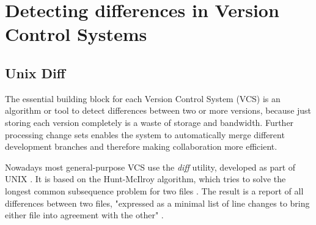 	
	

\section{Detecting differences in Version Control Systems}
	\label{sec:background:diff}
	
	\subsection{Unix Diff}
	\label{sec:background:diff:unix-diff}
	The essential building block for each Version Control System (VCS) is an algorithm or tool to detect differences between two or more versions, because just storing each version completely is a waste of storage and bandwidth. Further processing change sets enables the system to automatically merge different development branches and therefore making collaboration more efficient.
	
	Nowadays most general-purpose VCS use the \emph{diff} utility, developed as part of UNIX \citep{Chacon2014,OSullivan2009,Collins-Sussman2004}. It is based on the Hunt-McIlroy algorithm, which tries to solve the longest common subsequence problem for two files \citep{Hunt1976}.
	The result is a report of all differences between two files, "expressed as a minimal list of line changes to bring either file into agreement with the other" \citep{Hunt1976}.
	

	
